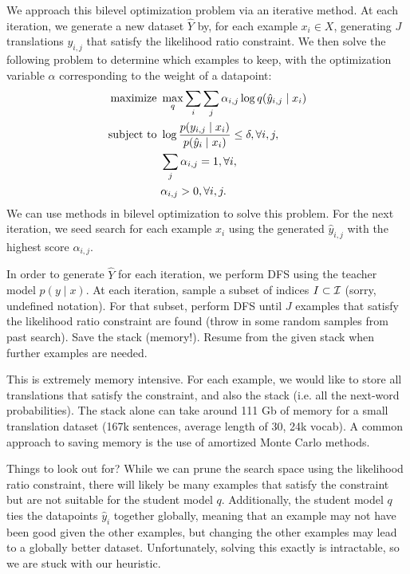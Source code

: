 \documentclass[11pt]{article}
\begin{document}
We approach this bilevel optimization problem via an iterative method.
At each iteration, we generate a new dataset $\hat{Y}$ by, for each example $x_i \in X$,
generating $J$ translations $y_{i,j}$ that satisfy the likelihood ratio constraint.
We then solve the following problem to determine which examples to keep,
with the optimization variable $\alpha$ corresponding to the weight of a datapoint:
\begin{equation}
    \begin{aligned}
    \textnormal{maximize }& \max_q \sum_i \sum_j \alpha_{i,j}  \log q(\hat{y}_{i,j} \mid x_i)\\
    \textnormal{subject to } & \log\frac{p(y_{i,j} \mid x_i)}{p(\hat{y}_i \mid x_i)}
        \le \delta, \forall i,j,\\
        & \sum_j \alpha_{i,j} = 1, \forall i, \\
        & \alpha_{i,j} > 0, \forall i,j.
    \end{aligned}
\end{equation}
We can use methods in bilevel optimization to solve this problem.
For the next iteration, we seed search for each example $x_i$
using the generated $\hat{y}_{i,j}$ with the highest score $\alpha_{i,j}$.

In order to generate $\hat{Y}$ for each iteration, we perform DFS using the teacher
model $p(y \mid x)$.
At each iteration, sample a subset of indices $I \subset \mathcal{I}$ (sorry, undefined notation).
For that subset, perform DFS until $J$ examples that satisfy the likelihood ratio constraint
are found (throw in some random samples from past search). Save the stack (memory!).
Resume from the given stack when further examples are needed.

This is extremely memory intensive. For each example,
we would like to store all translations that satisfy the constraint,
and also the stack (i.e. all the next-word probabilities).
The stack alone can take around 111 Gb of memory for a small translation dataset
(167k sentences, average length of 30, 24k vocab).
A common approach to saving memory is the use of amortized Monte Carlo methods.

Things to look out for?
While we can prune the search space using the likelihood ratio constraint,
there will likely be many examples that satisfy the constraint but are not suitable for
the student model $q$.
Additionally, the student model $q$ ties the datapoints $\hat{y}_i$ together globally,
meaning that an example may not have been good given the other examples,
but changing the other examples may lead to a globally better dataset.
Unfortunately, solving this exactly is intractable, so we are stuck with our heuristic.
\end{document}

